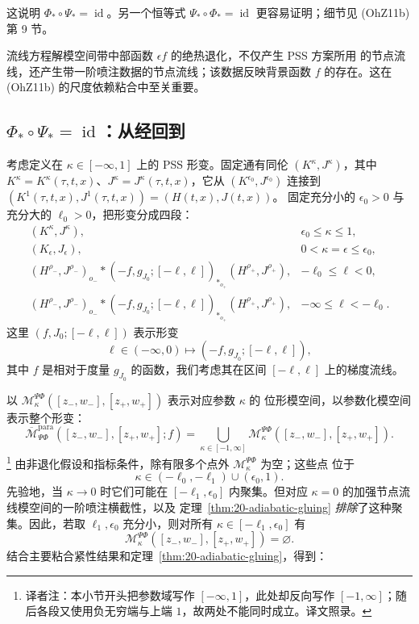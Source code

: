 这说明 $\Phi_*\circ\Psi_*=\operatorname{id}$。另一个恒等式
$\Psi_*\circ\Phi_*=\operatorname{id}$ 更容易证明；细节见 (OhZ11b) 第 9 节。

\begin{remark}
\label{rem:20-one-jet-datum}
\personFloer{}流线方程解模空间带中部\personMorse{}函数 $\epsilon f$ 的绝热退化，不仅产生 PSS 方案所用
的节点\personFloer{}流线，还产生带一阶喷注数据的节点\personFloer{}流线；该数据反映背景\personMorse{}函数 $f$ 的存在。这在 (OhZ11b) 的尺度依赖粘合中至关重要。
\end{remark}

\subsection{\texorpdfstring{$\Phi_*\circ\Psi_*=\operatorname{id}$}{Phi o Psi = id}：从\personFloer{}经\personMorse{}回到\personFloer{}}

考虑定义在 $\kappa\in[-\infty,1]$ 上的 PSS 形变。固定通有同伦
$(K^\kappa,J^\kappa)$，其中
$K^\kappa=K^\kappa(\tau,t,x)$、$J^\kappa=J^\kappa(\tau,t,x)$，它从
$(K^{\epsilon_0},J^{\epsilon_0})$ 连接到
$(K^1(\tau,t,x),J^1(\tau,t,x))=(H(t,x),J(t,x))$。
固定充分小的 $\epsilon_0>0$ 与充分大的 $\ell_0>0$，把形变分成四段：
\[
 \begin{array}{ll}
 (K^\kappa,J^\kappa),&\epsilon_0\leq\kappa\leq1,\\
 (K_\epsilon,J_\epsilon),&0<\kappa=\epsilon\leq\epsilon_0,\\
 (H^{\rho_-},J^{\rho_-})_{o_-}*(-f,g_{J_0};[-\ell,\ell])_{*_{o_+}}
 (H^{\rho_+},J^{\rho_+}),&-\ell_0\leq\ell<0,\\
 (H^{\rho_-},J^{\rho_-})_{o_-}*(-f,g_{J_0};[-\ell,\ell])_{*_{o_+}}
 (H^{\rho_+},J^{\rho_+}),&-\infty\leq\ell<-\ell_0.
 \end{array}
\]
这里 $(f,J_0;[-\ell,\ell])$ 表示形变
\[
 \ell\in(-\infty,0)\longmapsto(-f,g_{J_0};[-\ell,\ell]),
\]
其中 $f$ 是相对于度量 $g_{J_0}$ 的\personMorse{}函数，我们考虑其在区间
$[-\ell,\ell]$ 上的梯度流线。

以 $\mathcal M_\kappa^{\Psi\Phi}([z_-,w_-],[z_+,w_+])$ 表示对应参数 $\kappa$ 的
位形模空间，以参数化模空间表示整个形变：
\[
 \overline{\mathcal M}_{\Psi\Phi}^{\mathrm{para}}
 ([z_-,w_-],[z_+,w_+];f)
 =\bigcup_{\kappa\in[-1,\infty]}
 \mathcal M_\kappa^{\Psi\Phi}([z_-,w_-],[z_+,w_+]).
\]
\footnote{译者注：本小节开头把参数域写作 $[-\infty,1]$，此处却反向写作
$[-1,\infty]$；随后各段又使用负无穷端与上端 $1$，故两处不能同时成立。译文照录。}
由非退化假设和指标条件，除有限多个点外 $\mathcal M_\kappa^{\Psi\Phi}$ 为空；这些点
位于
\[
 \kappa\in(-\ell_0,-\ell_1)\cup(\epsilon_0,1).
\]
先验地，当 $\kappa\to0$ 时它们可能在 $[-\ell_1,\epsilon_0]$ 内聚集。但对应
$\kappa=0$ 的加强节点\personFloer{}流线模空间的一阶喷注横截性，以及
定理~\ref{thm:20-adiabatic-gluing} \emph{排除}了这种聚集。因此，若取 $\ell_1,\epsilon_0$
充分小，则对所有 $\kappa\in[-\ell_1,\epsilon_0]$ 有
\[
 \mathcal M_\kappa^{\Psi\Phi}([z_-,w_-],[z_+,w_+])=\varnothing.
\]
结合主要粘合紧性结果和定理~\ref{thm:20-adiabatic-gluing}，得到：

